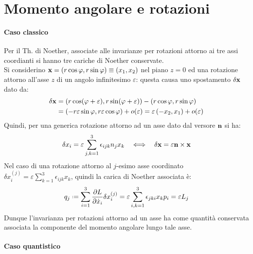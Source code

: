 
\section{Momento angolare e rotazioni}

\paragraph{Caso classico}

Per il Th. di Noether, associate alle invarianze per rotazioni attorno ai tre assi coordianti si hanno tre cariche di Noether conservate.\\
Si considerino $ \mathbf{x} = \left( r\cos \varphi, r\sin \varphi \right) \equiv \left( x_1, x_2 \right) $ nel piano $ z = 0 $ ed una rotazione attorno all'asse $ z $ di un angolo infinitesimo $ \varepsilon $: questa causa uno spostamento $ \delta\mathbf{x} $ dato da:
\begin{equation*}
	\begin{split}
		\delta\mathbf{x}
		&= \left( r\cos (\varphi + \varepsilon), r\sin (\varphi + \varepsilon) \right) - \left( r\cos \varphi, r\sin \varphi \right)\\
		&= \left( -r \varepsilon \sin \varphi, r \varepsilon \cos \varphi \right) + o(\varepsilon) = \varepsilon \left( -x_2, x_1 \right) + o(\varepsilon)
	\end{split}
\end{equation*}
Quindi, per una generica rotazione attorno ad un asse dato dal versore $ \mathbf{n} $ si ha:
\begin{equation}
	\delta x_i = \varepsilon \sum_{j,k = 1}^{3} \epsilon_{ijk} n_j x_k \quad\Longleftrightarrow\quad \delta\mathbf{x} = \varepsilon \mathbf{n}\times\mathbf{x}
	\label{eq:2.1}
\end{equation}
Nel caso di una rotazione attorno al $ j $-esimo asse coordinato $ \delta x_i^{(j)} = \varepsilon \sum_{k = 1}^{3} \epsilon_{ijk} x_k $, quindi la carica di Noether associata è:
\begin{equation}
	q_j \defeq \sum_{i = 1}^{3} \frac{\pa L}{\pa \dot{x}_i} \delta x_i^{(j)} = \varepsilon \sum_{i,k = 1}^{3} \epsilon_{jki} x_k p_i = \varepsilon L_j
	\label{eq:2.2}
\end{equation}
Dunque l'invarianza per rotazioni attorno ad un asse ha come quantità conservata associata la componente del momento angolare lungo tale asse.

\paragraph{Caso quantistico}

